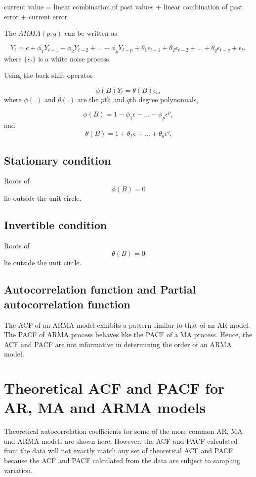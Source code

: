 \documentclass[
  11pt,
  a4paper,
]{report}
\begin{document}
current value = linear combination of past values + linear combination
of past error + current error

The \(ARMA(p, q)\) can be written as

\[Y_t=c+\phi_1 Y_{t-1}+\phi_2 Y_{t-2}+...+\phi_p Y_{t-p}+\theta_1\epsilon_{t-1}+\theta_2\epsilon_{t-2}+...+\theta_q\epsilon_{t-q}+\epsilon_t,\]
where \(\{\epsilon_t\}\) is a white noise process.

Using the back shift operator

\[\phi(B)Y_t=\theta(B)\epsilon_t,\] where \(\phi(.)\) and \(\theta(.)\)
are the \(p\)th and \(q\)th degree polynomials,

\[\phi(B)=1-\phi_1 \epsilon -...-\phi_p \epsilon^p,\] and
\[\theta(B)=1+\theta_1\epsilon+...+\theta_q\epsilon^q.\]

\section{Stationary condition}\label{stationary-condition}

Roots of \[\phi(B)=0\] lie outside the unit circle.

\section{Invertible condition}\label{invertible-condition}

Roots of \[\theta(B)=0\] lie outside the unit circle.

\section{Autocorrelation function and Partial autocorrelation
function}\label{autocorrelation-function-and-partial-autocorrelation-function}

The ACF of an ARMA model exhibits a pattern similar to that of an AR
model. The PACF of ARMA process behaves like the PACF of a MA process.
Hence, the ACF and PACF are not informative in determining the order of
an ARMA model.


\chapter{Theoretical ACF and PACF for AR, MA and ARMA
models}\label{theoretical-acf-and-pacf-for-ar-ma-and-arma-models}

Theoretical autocorrelation coefficients for some of the more common AR,
MA and ARMA models are shown here. However, the ACF and PACF calculated
from the data will not exactly match any set of theoretical ACF and PACF
because the ACF and PACF calculated from the data are subject to
sampling variation.
\end{document}
